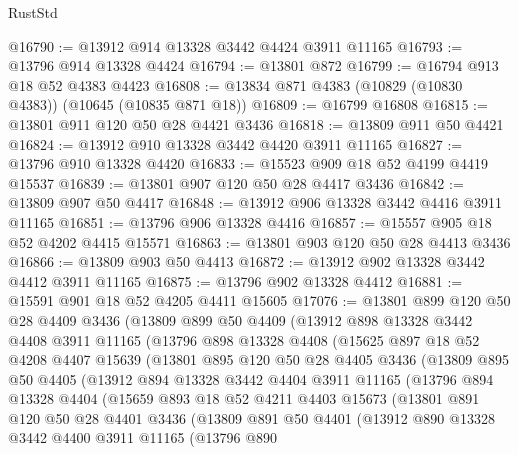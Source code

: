 \begin{lexlean}{RustStd}
\begin{coremodule}
@16790 := @13912 @914 @13328 @3442 @4424 @3911 @11165
@16793 := @13796 @914 @13328 @4424
@16794 := @13801 @872
@16799 := @16794 @913 @18 @52 @4383 @4423
@16808 := @13834 @871 @4383 (@10829 (@10830 @4383)) (@10645 (@10835 @871 @18))
@16809 := @16799 @16808
@16815 := @13801 @911 @120 @50 @28 @4421 @3436
@16818 := @13809 @911 @50 @4421
@16824 := @13912 @910 @13328 @3442 @4420 @3911 @11165
@16827 := @13796 @910 @13328 @4420
@16833 := @15523 @909 @18 @52 @4199 @4419 @15537
@16839 := @13801 @907 @120 @50 @28 @4417 @3436
@16842 := @13809 @907 @50 @4417
@16848 := @13912 @906 @13328 @3442 @4416 @3911 @11165
@16851 := @13796 @906 @13328 @4416
@16857 := @15557 @905 @18 @52 @4202 @4415 @15571
@16863 := @13801 @903 @120 @50 @28 @4413 @3436
@16866 := @13809 @903 @50 @4413
@16872 := @13912 @902 @13328 @3442 @4412 @3911 @11165
@16875 := @13796 @902 @13328 @4412
@16881 := @15591 @901 @18 @52 @4205 @4411 @15605
@17076 := @13801
    @899
    @120
    @50
    @28
    @4409
    @3436
    (@13809
      @899
      @50
      @4409
      (@13912
        @898
        @13328
        @3442
        @4408
        @3911
        @11165
        (@13796
          @898
          @13328
          @4408
          (@15625
            @897
            @18
            @52
            @4208
            @4407
            @15639
            (@13801
              @895
              @120
              @50
              @28
              @4405
              @3436
              (@13809
                @895
                @50
                @4405
                (@13912
                  @894
                  @13328
                  @3442
                  @4404
                  @3911
                  @11165
                  (@13796
                    @894
                    @13328
                    @4404
                    (@15659
                      @893
                      @18
                      @52
                      @4211
                      @4403
                      @15673
                      (@13801
                        @891
                        @120
                        @50
                        @28
                        @4401
                        @3436
                        (@13809
                          @891
                          @50
                          @4401
                          (@13912
                            @890
                            @13328
                            @3442
                            @4400
                            @3911
                            @11165
                            (@13796
                              @890

\end{coremodule}
\end{lexlean}

